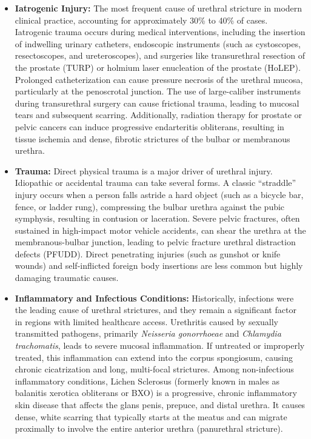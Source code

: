 \begin{itemize}
  \item \textbf{Iatrogenic Injury:} The most frequent cause of urethral stricture in modern clinical practice, accounting for approximately 30\% to 40\% of cases. Iatrogenic trauma occurs during medical interventions, including the insertion of indwelling urinary catheters, endoscopic instruments (such as cystoscopes, resectoscopes, and ureteroscopes), and surgeries like transurethral resection of the prostate (TURP) or holmium laser enucleation of the prostate (HoLEP). Prolonged catheterization can cause pressure necrosis of the urethral mucosa, particularly at the penoscrotal junction. The use of large-caliber instruments during transurethral surgery can cause frictional trauma, leading to mucosal tears and subsequent scarring. Additionally, radiation therapy for prostate or pelvic cancers can induce progressive endarteritis obliterans, resulting in tissue ischemia and dense, fibrotic strictures of the bulbar or membranous urethra.
  \item \textbf{Trauma:} Direct physical trauma is a major driver of urethral injury. Idiopathic or accidental trauma can take several forms. A classic ``straddle'' injury occurs when a person falls astride a hard object (such as a bicycle bar, fence, or ladder rung), compressing the bulbar urethra against the pubic symphysis, resulting in contusion or laceration. Severe pelvic fractures, often sustained in high-impact motor vehicle accidents, can shear the urethra at the membranous-bulbar junction, leading to pelvic fracture urethral distraction defects (PFUDD). Direct penetrating injuries (such as gunshot or knife wounds) and self-inflicted foreign body insertions are less common but highly damaging traumatic causes.
  \item \textbf{Inflammatory and Infectious Conditions:} Historically, infections were the leading cause of urethral strictures, and they remain a significant factor in regions with limited healthcare access. Urethritis caused by sexually transmitted pathogens, primarily \textit{Neisseria gonorrhoeae} and \textit{Chlamydia trachomatis}, leads to severe mucosal inflammation. If untreated or improperly treated, this inflammation can extend into the corpus spongiosum, causing chronic cicatrization and long, multi-focal strictures. Among non-infectious inflammatory conditions, Lichen Sclerosus (formerly known in males as balanitis xerotica obliterans or BXO) is a progressive, chronic inflammatory skin disease that affects the glans penis, prepuce, and distal urethra. It causes dense, white scarring that typically starts at the meatus and can migrate proximally to involve the entire anterior urethra (panurethral stricture).

\end{itemize}
